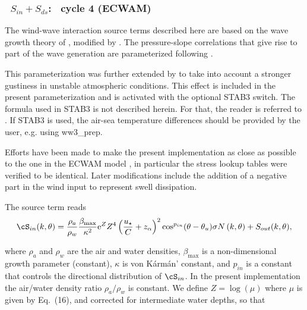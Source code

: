 \vsssub
\subsubsection{~$S_{in} + S_{ds}$: \wam\ cycle 4 (ECWAM)} \label{sec:ST3}
\vsssub


\noindent 
The wind-wave interaction source terms described here are based on the wave
growth theory of \cite{art:Miles57}, modified by \cite{art:Jan82}. The
pressure-slope correlations that give rise to part of the wave generation are
parameterized following \cite{art:Jan91}. 

This parameterization was further extended by \cite{rep:AB02} to take into
account a stronger gustiness in unstable atmospheric conditions. This effect is
included in the present parameterization and is activated with the optional
{\code STAB3} switch. The formula used in {\code STAB3} is not described herein. 
For that, the reader is referred to \cite{rep:AB02}. If {\code STAB3} is used, the air-sea 
temperature differences should be provided by the user, e.g. using {\file ww3\_prep}.

Efforts have been made to make the present implementation as
close as possible to the one in the ECWAM model \citep{rep:Bea05}, in
particular the stress lookup tables were verified to be identical. 
Later modifications include the addition of a negative part in the wind input 
to represent swell dissipation.

The source term reads \citep{bk:Jan04}
\begin{equation}
\cS_{in}(k,\theta) =
\frac{\rho_a}{\rho_w}\frac{\beta_{\mathrm{max}}}{\kappa^2}{\mathrm e}^{Z}Z^4
\left(\frac{u_\star}{C}+z_\alpha\right)^2 \cos^{p_{in}}(\theta - \theta_u) \sigma N
\left(k,\theta\right) + S_{out}(k,\theta),\label{eq:SinWAM4}
\end{equation}

\noindent where $\rho_a$ and $\rho_w$ are the air and water densities,
$\beta_{\mathrm{max}}$ is a non-dimensional growth parameter (constant),
$\kappa$ is von K\'{a}rm\'{a}n' constant, and $p_{in}$ is a constant that
controls the directional distribution of $\cS_{in}$. In the present
implementation the air/water density ratio ${\rho_a}/{\rho_w}$ is constant. We
define $Z=\log(\mu)$ where $\mu$ is given by \cite{art:Jan91}  Eq.~(16), and
corrected for intermediate water depths, so that

